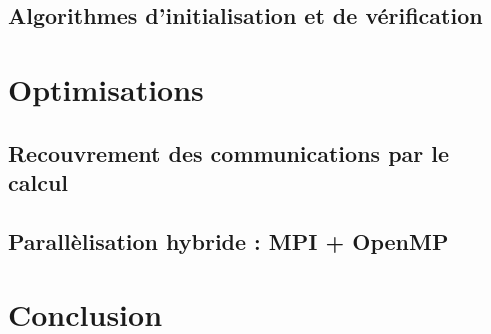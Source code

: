 \documentclass[a4paper]{article}
\begin{document}
\subsection{Algorithmes d'initialisation et de vérification}

\section{Optimisations}

\subsection{Recouvrement des communications par le calcul}

\subsection{Parallèlisation hybride : MPI + OpenMP}

\section{Conclusion}
\end{document}

